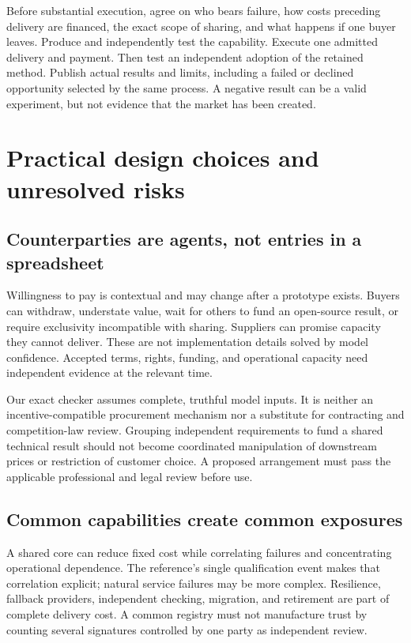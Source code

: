 \documentclass[11pt,letterpaper]{article}
\theoremstyle{remark}\newtheorem{remark}{Remark}[section]
\begin{document}
Before substantial execution, agree on who bears failure, how costs preceding delivery are financed, the exact scope of sharing, and what happens if one buyer leaves. Produce and independently test the capability. Execute one admitted delivery and payment. Then test an independent adoption of the retained method. Publish actual results and limits, including a failed or declined opportunity selected by the same process. A negative result can be a valid experiment, but not evidence that the market has been created.

\section{Practical design choices and unresolved risks}
\subsection{Counterparties are agents, not entries in a spreadsheet}
Willingness to pay is contextual and may change after a prototype exists. Buyers can withdraw, understate value, wait for others to fund an open-source result, or require exclusivity incompatible with sharing. Suppliers can promise capacity they cannot deliver. These are not implementation details solved by model confidence. Accepted terms, rights, funding, and operational capacity need independent evidence at the relevant time.

Our exact checker assumes complete, truthful model inputs. It is neither an incentive-compatible procurement mechanism nor a substitute for contracting and competition-law review. Grouping independent requirements to fund a shared technical result should not become coordinated manipulation of downstream prices or restriction of customer choice. A proposed arrangement must pass the applicable professional and legal review before use.

\subsection{Common capabilities create common exposures}
A shared core can reduce fixed cost while correlating failures and concentrating operational dependence. The reference's single qualification event makes that correlation explicit; natural service failures may be more complex. Resilience, fallback providers, independent checking, migration, and retirement are part of complete delivery cost. A common registry must not manufacture trust by counting several signatures controlled by one party as independent review.
\end{document}
